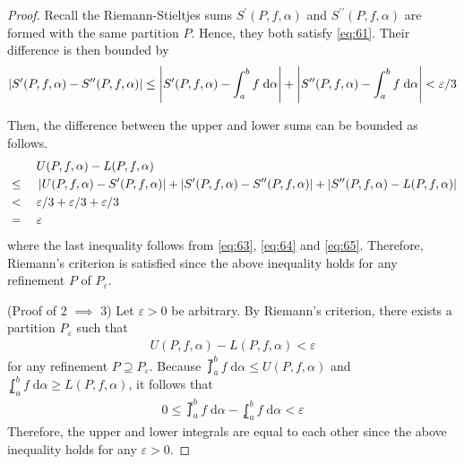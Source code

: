 \documentclass[thmcnt=section, 12pt]{my-elegantbook}
\begin{document}
\begin{proof}
    Recall the Riemann-Stieltjes sums $S^{\prime}(P,f,\alpha)$ and $S^{\prime\prime}(P,f,\alpha)$ are formed with the same partition $P$. Hence, they both satisfy \eqref{eq:61}. Their difference is then bounded by 
    \begin{align}
        \left\lvert S^{\prime}(P,f,\alpha) - S^{\prime\prime}(P,f,\alpha) \right\rvert
        \leq \left\lvert S^{\prime}(P,f,\alpha) - \int_{a}^{b} f \; \mathrm{d}\alpha \right\rvert
        + \left\lvert S^{\prime\prime}(P,f,\alpha) - \int_{a}^{b} f \; \mathrm{d}\alpha \right\rvert
        < \varepsilon / 3
        \label{eq:65}
    \end{align} 

    Then, the difference between the upper and lower sums can be bounded as follows.
    \begin{alignat*}{2}
        &&\;& U(P,f,\alpha) - L(P,f,\alpha) \\
        &\leq&& \left\lvert U(P,f,\alpha) - S^\prime(P,f,\alpha) \right\rvert
        + \left\lvert S^\prime(P,f,\alpha) - S^{\prime\prime}(P,f,\alpha) \right\rvert
        + \left\lvert S^{\prime\prime}(P,f,\alpha) - L(P,f,\alpha) \right\rvert \\
        &<&& \varepsilon / 3 + \varepsilon / 3 + \varepsilon / 3 \\
        &=&& \varepsilon
    \end{alignat*}
    where the last inequality follows from \eqref{eq:63}, \eqref{eq:64} and \eqref{eq:65}. Therefore, Riemann's criterion is satisfied since the above inequality holds for any refinement $P$ of $P_\varepsilon$.

    (Proof of 2 $\implies$ 3) Let $\varepsilon > 0$ be arbitrary. By Riemann's criterion, there exists a partition $P_\varepsilon$ such that 
    \begin{align*}
        U(P,f,\alpha) - L(P,f,\alpha) < \varepsilon
    \end{align*}
    for any refinement $P \supseteq P_\varepsilon$. Because $\upint_a^b f \; \mathrm{d}\alpha \leq U(P,f,\alpha)$ and $\lowint_a^b f \; \mathrm{d}\alpha \geq L(P,f,\alpha)$, it follows that 
    \begin{align*}
        0 \leq \upint_a^b f \; \mathrm{d}\alpha - \lowint_a^b f \; \mathrm{d}\alpha
        < \varepsilon
    \end{align*}
    Therefore, the upper and lower integrals are equal to each other since the above inequality holds for any $\varepsilon > 0$.


\end{proof}
\end{document}
